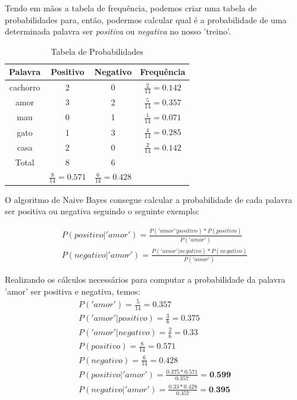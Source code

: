 \documentclass[
article,			%
12pt,				%
a4paper,			%
english,			%
brazil,				%
sumario=tradicional,
twoside
]{abntex2}
\begin{document}
	Tendo em mãos a tabela de frequência, podemos criar uma tabela de probabilidades para, então, podermos calcular qual é a probabilidade de uma determinada palavra ser \emph{positiva} ou \emph{negativa} no nosso 'treino'.
	
	\begin{table}[!h]
		\caption{Tabela de Probabilidades}
		\label{tab: tabelaProbabilidades}
		\centering
		
		\begin{tabular}{|c|c|c|c|} \hline
			\textbf{Palavra} & \textbf{Positivo} & \textbf{Negativo} & \textbf{Frequência} \\
			\hline
			cachorro	& 2 & 0 & $\frac{2}{14} = 0.142$ \\
			amor & 3 & 2 & $\frac{5}{14} = 0.357$ \\
			mau & 0 & 1 & $\frac{1}{14} = 0.071$ \\
			gato & 1 & 3 & $\frac{4}{14} = 0.285$ \\
			casa & 2 & 0 & $\frac{2}{14} = 0.142$ \\
			\hline
			Total & 8 & 6 & \\
			\hline
			& $\frac{8}{14} = 0.571$ & $\frac{6}{14} = 0.428 $ & \\
 			\hline
		\end{tabular}
		
	\end{table}

	O algoritmo de Naive Bayes consegue calcular a probabilidade de cada palavra ser positiva ou negativa seguindo o seguinte exemplo:
	
	\begin{eqnarray}
		\label{eq: equacaoNaiveBayes}
		P(positivo|'amor') = \frac{P('amor'|positivo) * P(positivo)}{P('amor')} \\
		P(negativo|'amor') = \frac{P('amor'|negativo) * P(negativo)}{P('amor')} 
	\end{eqnarray}
	
	Realizando os cálculos necessários para computar a probabilidade da palavra 'amor' ser positiva e negativa, temos:
	\begin{eqnarray}
		P('amor') = \frac{5}{14} = 0.357 \\
		P('amor'|positivo) = \frac{3}{8} = 0.375 \\
		P('amor'|negativo) = \frac{2}{6} = 0.33\\
		P(positivo) = \frac{8}{14} = 0.571 \\
		P(negativo) = \frac{6}{14} = 0.428 \\
		P(positivo|'amor') = \frac{0.375 * 0.571}{0.357} = \textbf{0.599}\\
		P(negativo|'amor') = \frac{0.33 * 0.428}{0.357} = \textbf{0.395} 
	\end{eqnarray}
	
\end{document}
